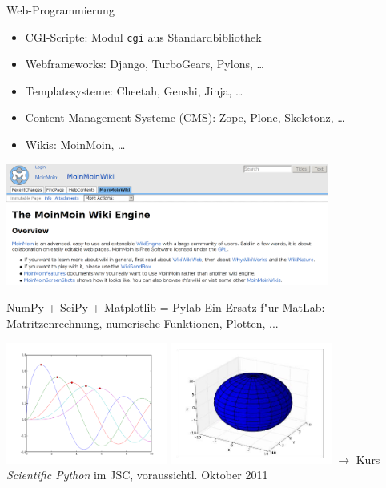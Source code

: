 \begin{frame}{Web-Programmierung}
\begin{itemize}
\item CGI-Scripte: Modul \texttt{cgi} aus  Standardbibliothek
\item Webframeworks: Django, TurboGears, Pylons, \dots
\item Templatesysteme: Cheetah, Genshi, Jinja, \dots
\item Content Management Systeme (CMS): Zope, Plone, Skeletonz, \dots
\item Wikis: MoinMoin, \dots
\end{itemize}

\includegraphics[height=4cm]{images/moinmoin.png}
\end{frame}

\begin{frame}[fragile]{NumPy + SciPy + Matplotlib = Pylab}
Ein Ersatz f"ur MatLab: Matritzenrechnung, numerische Funktionen, Plotten, ...

\includegraphics[height=4cm]{images/matplotlib.png}
\includegraphics[height=4cm]{images/surface.jpg}
\vfill
$\rightarrow$ Kurs \emph{Scientific Python} im JSC, voraussichtl. Oktober 2011
\end{frame}

